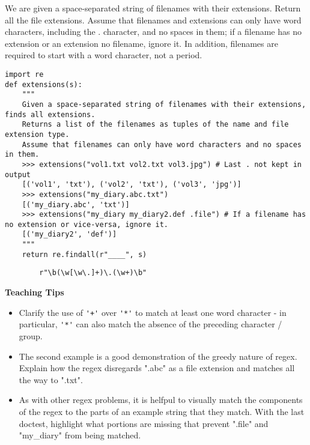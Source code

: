 \begin{blocksection}
\question We are given a space-separated string of filenames with their extensions. Return all the file extensions.
Assume that filenames and extensions can only have word characters, including the . character, and no spaces in them; if a filename has no extension or an extension no filename,
ignore it. In addition, filenames are required to start with a word character, not a period.

\begin{lstlisting}
import re
def extensions(s):
    """
    Given a space-separated string of filenames with their extensions, finds all extensions.
    Returns a list of the filenames as tuples of the name and file extension type.
    Assume that filenames can only have word characters and no spaces in them.
    >>> extensions("vol1.txt vol2.txt vol3.jpg") # Last . not kept in output
    [('vol1', 'txt'), ('vol2', 'txt'), ('vol3', 'jpg')]
    >>> extensions("my_diary.abc.txt")
    [('my_diary.abc', 'txt')]
    >>> extensions("my_diary my_diary2.def .file") # If a filename has no extension or vice-versa, ignore it.
    [('my_diary2', 'def')]
    """
    return re.findall(r"____", s)
\end{lstlisting}

\begin{solution}[2in]
    \begin{lstlisting}
        r"\b(\w[\w\.]+)\.(\w+)\b"
    \end{lstlisting}
\end{solution}
\end{blocksection}

\begin{guide}
\begin{blocksection}
\textbf{Teaching Tips}
    \begin{itemize}
        \item Clarify the use of \lstinline$'+'$ over \lstinline$'*'$ to match at least one word character - in particular, \lstinline$'*'$ can also match the absence of the preceding character / group.
        \item The second example is a good demonstration of the greedy nature of regex. Explain how the regex disregards ".abc" as a file extension and matches all the way to ".txt".
        \item As with other regex problems, it is helfpul to visually match the components of the regex to the parts of an example string that they match. With the last doctest, highlight what portions are missing that prevent ".file" and "my\_diary" from being matched.
    \end{itemize}
\end{blocksection}
\end{guide}